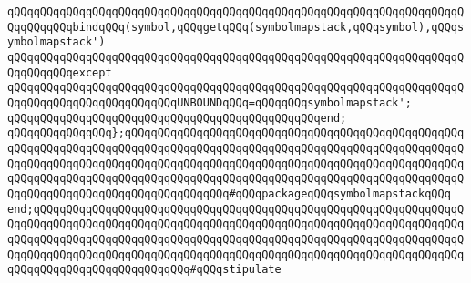 \verb|qQQqqQQqqQQqqQQqqQQqqQQqqQQqqQQqqQQqqQQqqQQqqQQqqQQqqQQqqQQqqQQqqQQqqQQqqQQqqQQqbindqQQq(symbol,qQQqgetqQQq(symbolmapstack,qQQqsymbol),qQQqsymbolmapstack')|\newline
\verb|qQQqqQQqqQQqqQQqqQQqqQQqqQQqqQQqqQQqqQQqqQQqqQQqqQQqqQQqqQQqqQQqqQQqqQQqqQQqqQQqexcept|\newline
\verb|qQQqqQQqqQQqqQQqqQQqqQQqqQQqqQQqqQQqqQQqqQQqqQQqqQQqqQQqqQQqqQQqqQQqqQQqqQQqqQQqqQQqqQQqqQQqqQQqUNBOUNDqQQq=qQQqqQQqsymbolmapstack';|\newline
\verb|qQQqqQQqqQQqqQQqqQQqqQQqqQQqqQQqqQQqqQQqqQQqqQQqend;|\newline
\verb|qQQqqQQqqQQqqQQq};qQQqqQQqqQQqqQQqqQQqqQQqqQQqqQQqqQQqqQQqqQQqqQQqqQQqqQQqqQQqqQQqqQQqqQQqqQQqqQQqqQQqqQQqqQQqqQQqqQQqqQQqqQQqqQQqqQQqqQQqqQQqqQQqqQQqqQQqqQQqqQQqqQQqqQQqqQQqqQQqqQQqqQQqqQQqqQQqqQQqqQQqqQQqqQQqqQQqqQQqqQQqqQQqqQQqqQQqqQQqqQQqqQQqqQQqqQQqqQQqqQQqqQQqqQQqqQQqqQQqqQQqqQQqqQQqqQQqqQQqqQQqqQQqqQQqqQQq#qQQqpackageqQQqsymbolmapstackqQQq|\newline
\verb|end;qQQqqQQqqQQqqQQqqQQqqQQqqQQqqQQqqQQqqQQqqQQqqQQqqQQqqQQqqQQqqQQqqQQqqQQqqQQqqQQqqQQqqQQqqQQqqQQqqQQqqQQqqQQqqQQqqQQqqQQqqQQqqQQqqQQqqQQqqQQqqQQqqQQqqQQqqQQqqQQqqQQqqQQqqQQqqQQqqQQqqQQqqQQqqQQqqQQqqQQqqQQqqQQqqQQqqQQqqQQqqQQqqQQqqQQqqQQqqQQqqQQqqQQqqQQqqQQqqQQqqQQqqQQqqQQqqQQqqQQqqQQqqQQqqQQqqQQqqQQqqQQq#qQQqstipulate|\newline
\newline

